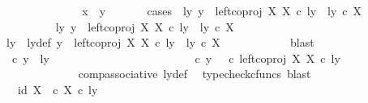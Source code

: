 \begin{isabellebody}
\ \ \ \ \ \ \isamarkupfalse%
\isanewline
\ \ \ \ \ \ \isamarkupfalse%
\ {\isachardoublequoteopen}x\ {\isacharequal}{\kern0pt}\ y{\isachardoublequoteclose}\isanewline
\ \ \ \ \ \ \isamarkupfalse%
{\isacharparenleft}{\kern0pt}cases\ {\isachardoublequoteopen}{\isasymexists}\ ly{\isachardot}{\kern0pt}\ y\ {\isacharequal}{\kern0pt}\ left{\isacharunderscore}{\kern0pt}coproj\ X\ X\ {\isasymcirc}\isactrlsub c\ ly\ {\isasymand}\ ly\ {\isasymin}\isactrlsub c\ X{\isachardoublequoteclose}{\isacharparenright}{\kern0pt}\isanewline
\ \ \ \ \ \ \ \ \isamarkupfalse%
\ {\isachardoublequoteopen}{\isasymexists}ly{\isachardot}{\kern0pt}\ y\ {\isacharequal}{\kern0pt}\ left{\isacharunderscore}{\kern0pt}coproj\ X\ X\ {\isasymcirc}\isactrlsub c\ ly\ {\isasymand}\ ly\ {\isasymin}\isactrlsub c\ X{\isachardoublequoteclose}\isanewline
\ \ \ \ \ \ \ \ \isamarkupfalse%
\ \isamarkupfalse%
\ ly\ \ ly{\isacharunderscore}{\kern0pt}def{\isacharcolon}{\kern0pt}\ {\isachardoublequoteopen}y\ {\isacharequal}{\kern0pt}\ left{\isacharunderscore}{\kern0pt}coproj\ X\ X\ {\isasymcirc}\isactrlsub c\ ly\ {\isasymand}\ ly\ {\isasymin}\isactrlsub c\ X{\isachardoublequoteclose}\isanewline
\ \ \ \ \ \ \ \ \ \ \isamarkupfalse%
\ blast\isanewline
\ \ \ \ \ \ \ \ \isamarkupfalse%
\ {\isachardoublequoteopen}{\isasymrho}\ {\isasymcirc}\isactrlsub c\ y\ {\isacharequal}{\kern0pt}\ {\isasymlangle}ly{\isacharcomma}{\kern0pt}\ {\isasymt}{\isasymrangle}{\isachardoublequoteclose}\isanewline
\ \ \ \ \ \ \ \ \isamarkupfalse%
\ {\isacharminus}{\kern0pt}\ \isanewline
\ \ \ \ \ \ \ \ \ \ \isamarkupfalse%
\ {\isachardoublequoteopen}{\isasymrho}\ {\isasymcirc}\isactrlsub c\ y\ {\isacharequal}{\kern0pt}\ {\isacharparenleft}{\kern0pt}{\isasymrho}\ {\isasymcirc}\isactrlsub c\ left{\isacharunderscore}{\kern0pt}coproj\ X\ X{\isacharparenright}{\kern0pt}\ {\isasymcirc}\isactrlsub c\ ly{\isachardoublequoteclose}\isanewline
\ \ \ \ \ \ \ \ \ \ \ \ \isamarkupfalse%
\ comp{\isacharunderscore}{\kern0pt}associative{}\ ly{\isacharunderscore}{\kern0pt}def\ \isamarkupfalse%
\ {\isacharparenleft}{\kern0pt}typecheck{\isacharunderscore}{\kern0pt}cfuncs{\isacharcomma}{\kern0pt}\ blast{\isacharparenright}{\kern0pt}\isanewline
\ \ \ \ \ \ \ \ \ \ \isamarkupfalse%
\ \isamarkupfalse%
\ {\isachardoublequoteopen}{\isachardot}{\kern0pt}{\isachardot}{\kern0pt}{\isachardot}{\kern0pt}\ {\isacharequal}{\kern0pt}\ {\isasymlangle}id\ X{\isacharcomma}{\kern0pt}\ {\isasymt}\ {\isasymcirc}\isactrlsub c\ {\isasymbeta}\isactrlbsub X\isactrlesub {\isasymrangle}\ {\isasymcirc}\isactrlsub c\ ly{\isachardoublequoteclose}\isanewline

\end{isabellebody}
